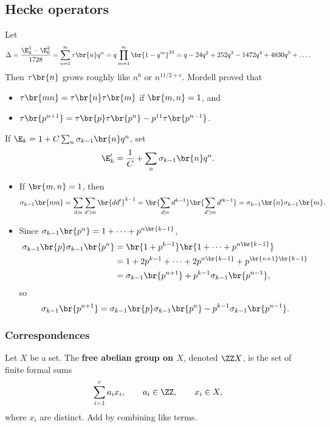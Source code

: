 \pagebreak

\subsection{Hecke operators}


Let
$$ \Delta = \dfrac{\E_4^3 - \E_6^2}{1728} = \sum_{n = 1}^\infty \tau\br{n}q^n = q\prod_{m = 1}^\infty \br{1 - q^m}^{24} = q - 24q^2 + 252q^3 - 1472q^4 + 4830q^5 + \dots. $$
Then $ \tau\br{n} $ grows roughly like $ n^6 $ or $ n^{11 / 2 + \epsilon} $. Mordell proved that
\begin{itemize}
\item $ \tau\br{mn} = \tau\br{n}\tau\br{m} $ if $ \br{m, n} = 1 $, and
\item $ \tau\br{p^{n + 1}} = \tau\br{p}\tau\br{p^n} - p^{11}\tau\br{p^{n - 1}} $.
\end{itemize}

\begin{note*}
If $ \E_k = 1 + C\sum_n \sigma_{k - 1}\br{n}q^n $, set
$$ \E_k' = \dfrac{1}{C} + \sum_n \sigma_{k - 1}\br{n}q^n. $$
\begin{itemize}
\item If $ \br{m, n} = 1 $, then
$$ \sigma_{k - 1}\br{nm} = \sum_{d \mid n} \sum_{d' \mid m} \br{dd'}^{k - 1} = \br{\sum_{d \mid n} d^{k - 1}}\br{\sum_{d' \mid m} d'^{k - 1}} = \sigma_{k - 1}\br{n}\sigma_{k - 1}\br{m}. $$
\item Since $ \sigma_{k - 1}\br{p^n} = 1 + \dots + p^{n\br{k - 1}} $,
\begin{align*}
\sigma_{k - 1}\br{p}\sigma_{k - 1}\br{p^n}
& = \br{1 + p^{k - 1}}\br{1 + \dots + p^{n\br{k - 1}}} \\
& = 1 + 2p^{k - 1} + \dots + 2p^{n\br{k - 1}} + p^{\br{n + 1}\br{k - 1}} \\
& = \sigma_{k - 1}\br{p^{n + 1}} + p^{k - 1}\sigma_{k - 1}\br{p^{n - 1}},
\end{align*}
so
$$ \sigma_{k - 1}\br{p^{n + 1}} = \sigma_{k - 1}\br{p}\sigma_{k - 1}\br{p^n} - p^{k - 1}\sigma_{k - 1}\br{p^{n - 1}}. $$
\end{itemize}
\end{note*}

\subsubsection{Correspondences}

\begin{definition}
Let $ X $ be a set. The \textbf{free abelian group on $ X $}, denoted $ \ZZ X $, is the set of finite formal sums
$$ \sum_{i = 1}^r a_ix_i, \qquad a_i \in \ZZ, \qquad x_i \in X, $$
where $ x_i $ are distinct. Add by combining like terms.
\end{definition}

